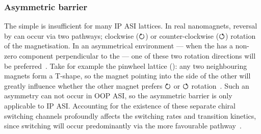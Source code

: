 \subsubsection{Asymmetric barrier}\label{sec:2:E_B_asymm}
The simple  is insufficient for many IP ASI lattices.
In real nanomagnets, reversal by  can occur via two pathways; clockwise ($\boldsymbol{\circlearrowright}$) or counter-clockwise ($\boldsymbol{\circlearrowleft}$) rotation of the magnetisation.
In an asymmetrical environment --- when the  has a non-zero component perpendicular to the  --- one of these two rotation directions will be preferred~\cite{leo2021chiral,DirectionalEnergyBarrier}.
Take for example the pinwheel lattice (): any two neighbouring magnets form a T-shape, so the magnet pointing into the side of the other will greatly influence whether the other magnet prefers $\boldsymbol{\circlearrowright}$ or $\boldsymbol{\circlearrowleft}$ rotation~\cite{DirectionalEnergyBarrier}. %
Such an asymmetry can not occur in OOP ASI, so the asymmetric barrier is only applicable to IP ASI.
Accounting for the existence of these separate chiral switching channels profoundly affects the switching rates and transition kinetics, since switching will occur predominantly via the more favourable pathway~\cite{leo2021chiral}. \\\par

